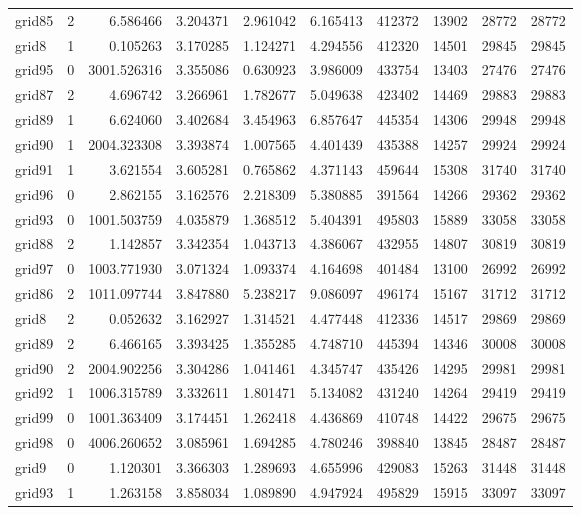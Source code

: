 \documentclass[../../../thesis.tex]{subfiles}
\begin{document}
\begin{longtable}{|l|r|r|r|r|r|r|r|r|r|}
grid85 & 2 & 6.586466 & 3.204371 & 2.961042 & 6.165413 & 412372 & 13902 & 28772 & 28772 \\
grid8 & 1 & 0.105263 & 3.170285 & 1.124271 & 4.294556 & 412320 & 14501 & 29845 & 29845 \\
grid95 & 0 & 3001.526316 & 3.355086 & 0.630923 & 3.986009 & 433754 & 13403 & 27476 & 27476 \\
grid87 & 2 & 4.696742 & 3.266961 & 1.782677 & 5.049638 & 423402 & 14469 & 29883 & 29883 \\
grid89 & 1 & 6.624060 & 3.402684 & 3.454963 & 6.857647 & 445354 & 14306 & 29948 & 29948 \\
grid90 & 1 & 2004.323308 & 3.393874 & 1.007565 & 4.401439 & 435388 & 14257 & 29924 & 29924 \\
grid91 & 1 & 3.621554 & 3.605281 & 0.765862 & 4.371143 & 459644 & 15308 & 31740 & 31740 \\
grid96 & 0 & 2.862155 & 3.162576 & 2.218309 & 5.380885 & 391564 & 14266 & 29362 & 29362 \\
grid93 & 0 & 1001.503759 & 4.035879 & 1.368512 & 5.404391 & 495803 & 15889 & 33058 & 33058 \\
grid88 & 2 & 1.142857 & 3.342354 & 1.043713 & 4.386067 & 432955 & 14807 & 30819 & 30819 \\
grid97 & 0 & 1003.771930 & 3.071324 & 1.093374 & 4.164698 & 401484 & 13100 & 26992 & 26992 \\
grid86 & 2 & 1011.097744 & 3.847880 & 5.238217 & 9.086097 & 496174 & 15167 & 31712 & 31712 \\
grid8 & 2 & 0.052632 & 3.162927 & 1.314521 & 4.477448 & 412336 & 14517 & 29869 & 29869 \\
grid89 & 2 & 6.466165 & 3.393425 & 1.355285 & 4.748710 & 445394 & 14346 & 30008 & 30008 \\
grid90 & 2 & 2004.902256 & 3.304286 & 1.041461 & 4.345747 & 435426 & 14295 & 29981 & 29981 \\
grid92 & 1 & 1006.315789 & 3.332611 & 1.801471 & 5.134082 & 431240 & 14264 & 29419 & 29419 \\
grid99 & 0 & 1001.363409 & 3.174451 & 1.262418 & 4.436869 & 410748 & 14422 & 29675 & 29675 \\
grid98 & 0 & 4006.260652 & 3.085961 & 1.694285 & 4.780246 & 398840 & 13845 & 28487 & 28487 \\
grid9 & 0 & 1.120301 & 3.366303 & 1.289693 & 4.655996 & 429083 & 15263 & 31448 & 31448 \\
grid93 & 1 & 1.263158 & 3.858034 & 1.089890 & 4.947924 & 495829 & 15915 & 33097 & 33097 \\

\end{longtable}
\end{document}
